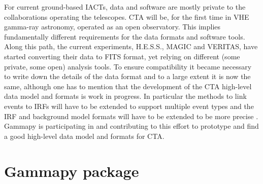 \documentclass{PoS}
\begin{document}

For current ground-based IACTs, data and software are mostly private to the
collaborations operating the telescopes. CTA will be, for the first time in VHE
gamma-ray astronomy, operated as an open observatory. This implies fundamentally
different requirements for the data formats and software tools. Along this path,
the current experiments, H.E.S.S., MAGIC and VERITAS, have started converting
their data to FITS format, yet relying on different (some private, some open)
analysis tools. To ensure compatibility it became necessary to write down the
details of the data format and to a large extent it is now the same, although
one has to mention that the development of the CTA high-level data model and
formats is work in progress. In particular the methods to link events to IRFs
will have to be extended to support multiple event types and the IRF and
background model formats will have to be extended to be more precise
\cite{opendata}. Gammapy is participating in and contributing to this effort to
prototype and find a good high-level data model and formats for CTA.


\section{Gammapy package}
\label{sec:package}
\end{document}
